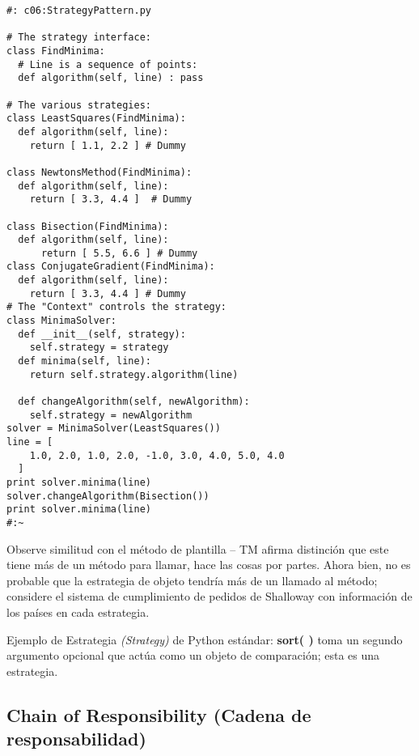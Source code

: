 \begin{lstlisting} 
#: c06:StrategyPattern.py 

# The strategy interface: 
class FindMinima: 
  # Line is a sequence of points: 
  def algorithm(self, line) : pass 
  
# The various strategies: 
class LeastSquares(FindMinima): 
  def algorithm(self, line): 
    return [ 1.1, 2.2 ] # Dummy 
    
class NewtonsMethod(FindMinima): 
  def algorithm(self, line): 
    return [ 3.3, 4.4 ]  # Dummy 
    
class Bisection(FindMinima): 
  def algorithm(self, line): 
      return [ 5.5, 6.6 ] # Dummy 
class ConjugateGradient(FindMinima): 
  def algorithm(self, line): 
    return [ 3.3, 4.4 ] # Dummy 
# The "Context" controls the strategy: 
class MinimaSolver: 
  def __init__(self, strategy): 
    self.strategy = strategy 
  def minima(self, line): 
    return self.strategy.algorithm(line) 
    
  def changeAlgorithm(self, newAlgorithm): 
    self.strategy = newAlgorithm 
solver = MinimaSolver(LeastSquares()) 
line = [ 
    1.0, 2.0, 1.0, 2.0, -1.0, 3.0, 4.0, 5.0, 4.0  
  ] 
print solver.minima(line) 
solver.changeAlgorithm(Bisection()) 
print solver.minima(line) 
#:~ 
\end{lstlisting}

Observe similitud con el método de plantilla  – TM afirma distinción que este tiene más de un método para llamar, hace las cosas por partes. Ahora bien, no es probable que la estrategia de objeto tendría más de un llamado al método; considere el sistema de cumplimiento de pedidos de Shalloway con información de los países en cada estrategia.  \newline

Ejemplo de Estrategia \textit{(Strategy)} de Python estándar: \textbf{sort( )} toma un segundo argumento opcional que actúa como un objeto de comparación; esta es una estrategia.    \newpage

\subsection*{Chain of Responsibility (Cadena de responsabilidad)}
\label{subsec:cdr}

